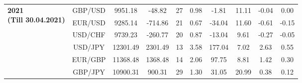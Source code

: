\documentclass[1p]{elsarticle}
\begin{document}
\begin{table}[h!]
\begin{center}
\begin{tabular}{p{3cm} c c c c c c c c c}
       \multirow{6}{*}{\parbox{3cm}{\textbf{2021 \\ (Till 30.04.2021)}}} & GBP/USD & 9951.18 & {\color{BrickRed} -48.82} & 27 & 0.98 & -1.81 & 11.11 & -0.04 & 0.00\\
       & EUR/USD & 9285.14 & {\color{BrickRed} -714.86} & 21 & 0.67 & -34.04 & 11.60 & -0.61 & -0.15\\
       & USD/CHF & 9739.23 & {\color{BrickRed} -260.77} & 20 & 0.87 & -13.04 & 9.61 & -0.27 & -0.05\\
       & USD/JPY & 12301.49 & {\color{OliveGreen} 2301.49} & 13 & 3.58 & 177.04 & 7.02 & 2.63 & 0.55\\
       & EUR/GBP & 11368.48 & {\color{OliveGreen} 1368.48} & 14 & 2.06 & 97.75 & 8.81 & 1.42 & 0.30\\
       & GBP/JPY & 10900.31 & {\color{OliveGreen} 900.31} & 29 & 1.30 & 31.05 & 20.99 & 0.38 & 0.12\\
       \hline

    \end{tabular}
  \end{center}
\end{table}

      


\end{document}
